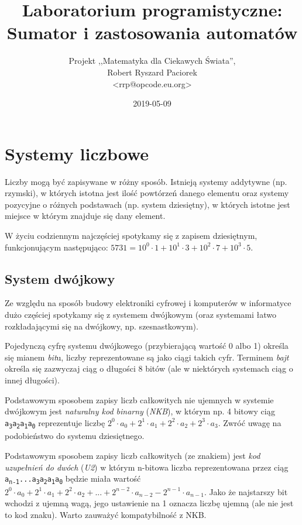 \documentclass{pdfBooklets}
\title{Laboratorium programistyczne:\\ Sumator i zastosowania automatów}
\author{%
	Projekt ,,Matematyka dla Ciekawych Świata'',\\
	Robert Ryszard Paciorek\\\normalsize\ttfamily <rrp@opcode.eu.org>
}
\date  {2019-05-09}
\begin{document}
\maketitle
\fi

\section{Systemy liczbowe}

Liczby mogą być zapisywane w różny sposób. Istnieją systemy addytywne (np. rzymski), w których istotna jest ilość powtórzeń danego elementu oraz systemy pozycyjne o różnych podstawach (np. system dziesiętny), w których istotne jest miejsce w którym znajduje się dany element.

W życiu codziennym najczęściej spotykamy się z zapisem dziesiętnym, funkcjonującym następująco: $5731 = 10^0 \cdot 1 + 10^1 \cdot 3 + 10^2 \cdot 7 + 10^3 \cdot 5$.

\subsection{System dwójkowy}

Ze względu na sposób budowy elektroniki cyfrowej i komputerów w informatyce dużo częściej spotykamy się z systemem dwójkowym (oraz systemami łatwo rozkładającymi się na dwójkowy, np. szesnastkowym).

Pojedynczą cyfrę systemu dwójkowego (przybierającą wartość 0 albo 1) określa się mianem \emph{bit}u, liczby reprezentowane są jako ciągi takich cyfr. Terminem \emph{bajt} określa się zazwyczaj ciąg o długości 8 bitów (ale w niektórych systemach ciąg o innej długości).

Podstawowym sposobem zapisy liczb całkowitych nie ujemnych w systemie dwójkowym jest \emph{naturalny kod binarny} (\emph{NKB}), w którym np. 4 bitowy ciąg {\tt a\textsubscript{3}a\textsubscript{2}a\textsubscript{1}a\textsubscript{0}} reprezentuje liczbę $2^0 \cdot a_0 + 2^1 \cdot a_1 + 2^2 \cdot a_2 + 2^3 \cdot a_3$. Zwróć uwagę na podobieństwo do systemu dziesiętnego.

Podstawowym sposobem zapisy liczb całkowitych (ze znakiem) jest \emph{kod uzupełnień do dwóch} (\emph{U2}) w którym n-bitowa liczba reprezentowana przez ciąg {\tt a\textsubscript{n-1}...a\textsubscript{3}a\textsubscript{2}a\textsubscript{1}a\textsubscript{0}} będzie miała wartość $2^0 \cdot a_0 + 2^1 \cdot a_1 + 2^2 \cdot a_2 + ... + 2^{n-2} \cdot a_{n-2} - 2^{n-1} \cdot a_{n-1}$. Jako że najstarszy bit wchodzi z ujemną wagą, jego ustawienie na 1 oznacza liczbę ujemną (ale nie jest to kod znaku). Warto zauważyć kompatybilność z NKB.
\end{document}
